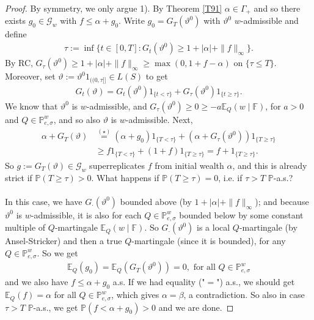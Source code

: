 \documentclass[12pt,a4paper, twoside]{article}
\theoremstyle{definition}
\newcommand{\EE}{\mathbb{E}} %
\newcommand{\PP}{\mathbb{P}} %
\begin{document}
\begin{proof}
By symmetry, we only argue 1). By Theorem \ref{T91} $\alpha \in \Gamma_+$ and so there exists $g_0 \in \mathcal{G}_w$ with $f \leq \alpha + g_0$. Write $g_0 = G_T( \vartheta^0)$ with $\vartheta^0$ $w$-admissible and define \begin{align*}
\tau := \inf \{ t \in [0,T]: G_t( \vartheta^0) \geq 1 + | \alpha | + \|f\|_\infty \}. 
\end{align*}
By RC, $G_\tau ( \vartheta^0) \geq 1 + | \alpha| + \|f\|_\infty \geq \max(0, 1 + f- \alpha)$ on $\{ \tau \leq T\}$. Moreover, set $\vartheta:= \vartheta^0 1_{(\!(0, \tau ]\!]} \in L(S)$ to get 
\begin{align*}
G_t( \vartheta) = G_t( \vartheta^0)1_{\{ t < \tau \}} + G_\tau( \vartheta^0)1_{\{ t \geq \tau \}}. \tag{$\star$}
\end{align*}
We know that $\vartheta^0$ is $w$-admissible, and $G_\tau ( \vartheta^0) \geq 0 \geq -a \EE_Q(w \mid \mathbb{F})$, for $a>0$ and $Q \in \PP_{e, \sigma}^w$, and so also $\vartheta$ is $w$-admissible.  Next, 
\begin{align*}
\alpha + G_T( \vartheta) &\overset{(\star)}= ( \alpha + g_0) 1_{\{ T < \tau\}} + ( \alpha + G_\tau( \vartheta^0))1_{\{ T \geq \tau\}} \\
& \geq f1_{\{ T < \tau\}} + (1+f)1_{\{ T \geq \tau\}} = f + 1_{\{ T \geq \tau\}}.
\end{align*}
So $g:= G_T( \vartheta) \in \mathcal{G}_w$ superreplicates $f$ from initial wealth $\alpha$, and this is already strict if $\PP( T \geq \tau)>0$. 
\newpage
What happens if $\PP( T \geq \tau )=0$, i.e. if $\tau > T$ $\PP$-a.s.? \\\\
In this case, we have $G_\cdot ( \vartheta^0)$ bounded above (by $1 + | \alpha| + \|f\|_\infty$); and because $\vartheta^0$ is $w$-admissible, it is also for each $Q \in \PP_{e, \sigma}^w$ bounded below by some constant multiple of $Q$-martingale $\EE_Q(w \mid \mathbb{F})$. So $G_\cdot( \vartheta^0)$ is a  local $Q$-martingale (by Ansel-Stricker) and then a true $Q$-martingale (since it is bounded), for any $Q \in \PP_{e,  \sigma}^w$. So we get 
\begin{align*}
\EE_Q(g_0) = \EE_Q( G_T( \vartheta^0))=0, \text{ for all } Q \in \PP_{e, \sigma}^w
\end{align*}
and we also have $f \leq \alpha + g_0$ a.s. If we had equality ("$=$") a.s., we should get $\EE_Q(f)= \alpha$ for all $Q \in \PP_{e, \sigma}^w$, which gives $\alpha= \beta$, a contradiction. So also in case $\tau > T$ $\PP$-a.s., we get $\PP(f < \alpha + g_0)>0$ and we are done. 
\end{proof}
\end{document}
